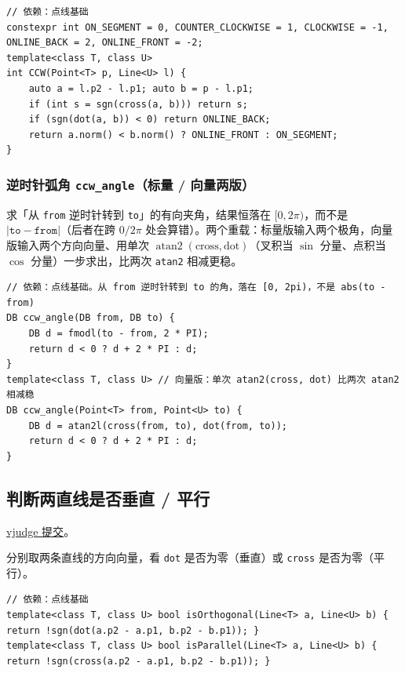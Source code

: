 \begin{verbatim}
// 依赖：点线基础
constexpr int ON_SEGMENT = 0, COUNTER_CLOCKWISE = 1, CLOCKWISE = -1, ONLINE_BACK = 2, ONLINE_FRONT = -2;
template<class T, class U>
int CCW(Point<T> p, Line<U> l) {
	auto a = l.p2 - l.p1; auto b = p - l.p1;
	if (int s = sgn(cross(a, b))) return s;
	if (sgn(dot(a, b)) < 0) return ONLINE_BACK;
	return a.norm() < b.norm() ? ONLINE_FRONT : ON_SEGMENT;
}
\end{verbatim}

		\subsubsection{逆时针弧角 \texttt{ccw\_angle}（标量 / 向量两版）}

		求「从 \texttt{from} 逆时针转到 \texttt{to}」的有向夹角，结果恒落在 $[0, 2\pi)$，而不是 $|\texttt{to} - \texttt{from}|$（后者在跨 $0/2\pi$ 处会算错）。两个重载：标量版输入两个极角，向量版输入两个方向向量、用单次 $\operatorname{atan2}(\mathrm{cross}, \mathrm{dot})$（叉积当 $\sin$ 分量、点积当 $\cos$ 分量）一步求出，比两次 \texttt{atan2} 相减更稳。

\begin{verbatim}
// 依赖：点线基础。从 from 逆时针转到 to 的角，落在 [0, 2pi)，不是 abs(to - from)
DB ccw_angle(DB from, DB to) {
	DB d = fmodl(to - from, 2 * PI);
	return d < 0 ? d + 2 * PI : d;
}
template<class T, class U> // 向量版：单次 atan2(cross, dot) 比两次 atan2 相减稳
DB ccw_angle(Point<T> from, Point<U> to) {
	DB d = atan2l(cross(from, to), dot(from, to));
	return d < 0 ? d + 2 * PI : d;
}
\end{verbatim}

		\subsection{判断两直线是否垂直 / 平行}

		\href{https://vjudge.net/solution/64175524}{vjudge 提交}。

		分别取两条直线的方向向量，看 \texttt{dot} 是否为零（垂直）或 \texttt{cross} 是否为零（平行）。

\begin{verbatim}
// 依赖：点线基础
template<class T, class U> bool isOrthogonal(Line<T> a, Line<U> b) { return !sgn(dot(a.p2 - a.p1, b.p2 - b.p1)); }
template<class T, class U> bool isParallel(Line<T> a, Line<U> b) { return !sgn(cross(a.p2 - a.p1, b.p2 - b.p1)); }
\end{verbatim}

